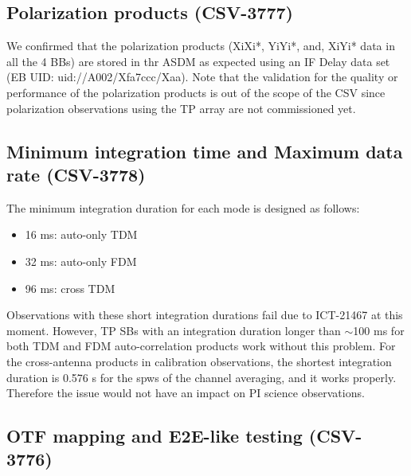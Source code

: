 \subsection{Polarization products (CSV-3777)}
We confirmed that the polarization products (XiXi*, YiYi*, and, XiYi* data in all the 4 BBs) are stored in thr ASDM as expected using an IF Delay data set (EB UID: uid://A002/Xfa7ccc/Xaa). Note that the validation for the quality or performance of the polarization products is out of the scope of the CSV since polarization observations using the TP array are not commissioned yet.

\subsection{Minimum integration time and Maximum data rate (CSV-3778)}
The minimum integration duration for each mode is designed as follows: 
\begin{itemize}
    \item 16 ms: auto-only TDM
    \item 32 ms: auto-only FDM
    \item 96 ms: cross TDM
\end{itemize}

Observations with these short integration durations fail due to ICT-21467 at this moment. However, TP SBs with an integration duration longer than $\sim$100 ms for both TDM and FDM auto-correlation products work without this problem. For the cross-antenna products in calibration observations, the shortest integration duration is 0.576 s for the spws of the channel averaging, and it works properly. Therefore the issue would not have an impact on PI science observations.  

\newpage

\subsection{OTF mapping and E2E-like testing (CSV-3776)}\label{sec:E2E}

